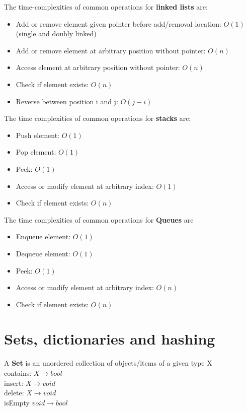 \documentclass{article}
\begin{document}
The time-complexities of common operations for \textbf{linked lists} are:
\begin{itemize}
    \item Add or remove element given pointer before add/removal location: $O(1)$ (single and doubly linked)
    \item Add or remove element at arbitrary position without pointer: $O(n)$
    \item Access element at arbitrary position without pointer: $O(n)$
    \item Check if element exists: $O(n)$
    \item Reverse between position i and j: $O(j-i)$
\end{itemize}

The time complexities of common operations for \textbf{stacks} are:
\begin{itemize}
    \item Push element: $O(1)$
    \item Pop element: $O(1)$
    \item Peek: $O(1)$
    \item Access or modify element at arbitrary index: $O(1)$
    \item Check if element exists: $O(n)$
\end{itemize}

The time complexities of common operations for \textbf{Queues} are
\begin{itemize}
    \item Enqueue element: $O(1)$
    \item Dequeue element: $O(1)$
    \item Peek: $O(1)$
    \item Access or modify element at arbitrary index: $O(n)$
    \item Check if element exists: $O(n)$
\end{itemize}

\section{Sets, dictionaries and hashing}

A \textbf{Set} is an unordered collection of objects/items of a given type X \\

contains: $X \rightarrow bool$ \\
insert: $X \rightarrow void$ \\
delete: $X \rightarrow void$ \\
isEmpty $void \rightarrow bool$ \\
\end{document}
